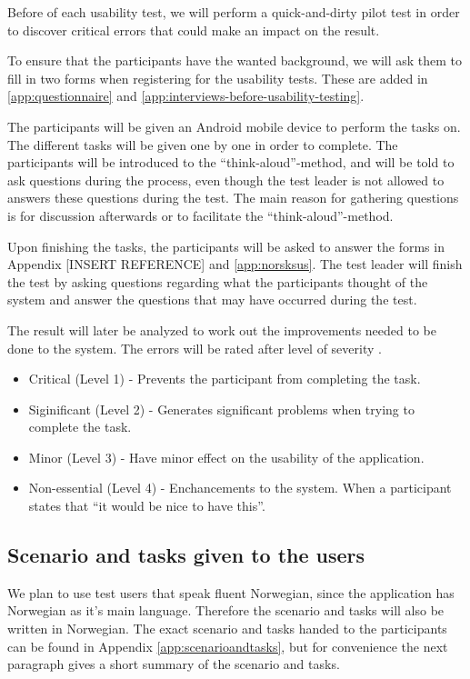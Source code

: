 Before of each usability test, we will perform a quick-and-dirty pilot test in order to discover critical errors that could make an impact on the result.

To ensure that the participants have the wanted background, we will ask them to fill in two forms when registering for the usability tests. These are added in \ref{app:questionnaire} and \ref{app:interviews-before-usability-testing}.


The participants will be given an Android mobile device to perform the tasks on. The different tasks will be given one by one in order to complete. The participants will be introduced to the ``think-aloud''-method, and will be told to ask questions during the process, even though the test leader is not allowed to answers these questions during the test. The main reason for gathering questions is for discussion afterwards or to facilitate the ``think-aloud''-method. 

Upon finishing the tasks, the participants will be asked to answer the forms in Appendix [INSERT REFERENCE] and \ref{app:norsksus}. The test leader will finish the test by asking questions regarding what the participants thought of the system and answer the questions that may have occurred during the test. 

The result will later be analyzed to work out the improvements needed to be done to the system. The errors will be rated after level of severity \cite{dumas1995practical}. 

\begin{itemize}
\item{Critical (Level 1) - Prevents the participant from completing the task.}
\item{Siginificant (Level 2) - Generates significant problems when trying to complete the task.}
\item{Minor (Level 3) - Have minor effect on the usability of the application.}
\item{Non-essential (Level 4) - Enchancements to the system. When a participant states that ``it would be nice to have this''.}
\end{itemize}



\subsection{Scenario and tasks given to the users}
We plan to use test users that speak fluent Norwegian, since the application has Norwegian as it's main language. Therefore the scenario and tasks will also be written in Norwegian. The exact scenario and tasks handed to the participants can be found in Appendix \ref{app:scenarioandtasks}, but for convenience the next paragraph gives a short summary of the scenario and tasks.

